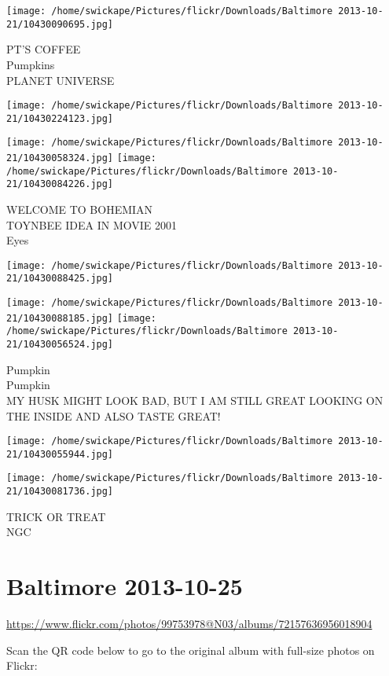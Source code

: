 \documentclass[10pt,letterpaper]{article}
\begin{document}
\texttt{[image: /home/swickape/Pictures/flickr/Downloads/Baltimore 2013-10-21/10430090695.jpg]}

PT'S COFFEE\\
Pumpkins\\
PLANET UNIVERSE
\pagebreak

\texttt{[image: /home/swickape/Pictures/flickr/Downloads/Baltimore 2013-10-21/10430224123.jpg]}

\vspace{0.25in}
\texttt{[image: /home/swickape/Pictures/flickr/Downloads/Baltimore 2013-10-21/10430058324.jpg]}
\texttt{[image: /home/swickape/Pictures/flickr/Downloads/Baltimore 2013-10-21/10430084226.jpg]}

WELCOME TO BOHEMIAN\\
TOYNBEE IDEA IN MOVIE 2001\\
Eyes
\pagebreak

\texttt{[image: /home/swickape/Pictures/flickr/Downloads/Baltimore 2013-10-21/10430088425.jpg]}

\vspace{0.25in}
\texttt{[image: /home/swickape/Pictures/flickr/Downloads/Baltimore 2013-10-21/10430088185.jpg]}
\texttt{[image: /home/swickape/Pictures/flickr/Downloads/Baltimore 2013-10-21/10430056524.jpg]}

Pumpkin\\
Pumpkin\\
MY HUSK MIGHT LOOK BAD, BUT I AM STILL GREAT LOOKING ON THE INSIDE AND ALSO TASTE GREAT!
\pagebreak

\texttt{[image: /home/swickape/Pictures/flickr/Downloads/Baltimore 2013-10-21/10430055944.jpg]}

\vspace{0.25in}
\texttt{[image: /home/swickape/Pictures/flickr/Downloads/Baltimore 2013-10-21/10430081736.jpg]}

TRICK OR TREAT\\
NGC
\pagebreak

\section*{Baltimore 2013-10-25}

\url{https://www.flickr.com/photos/99753978@N03/albums/72157636956018904}

Scan the QR code below to go to the original album with full-size photos on Flickr:
\end{document}
